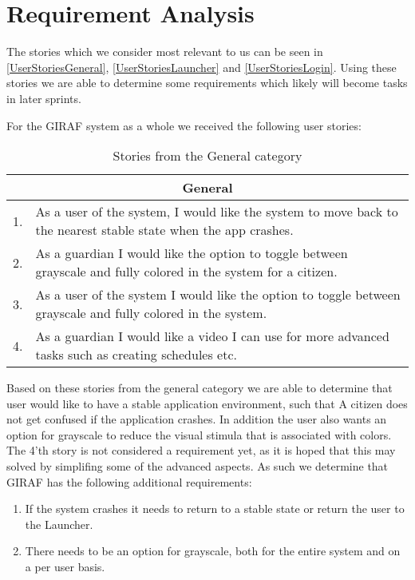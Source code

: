\section{Requirement Analysis}
The stories which we consider most relevant to us can be seen in
\autoref{UserStoriesGeneral}, \autoref{UserStoriesLauncher} and
\autoref{UserStoriesLogin}. Using these stories we are able to determine some
requirements which likely will become tasks in later sprints.\nl

For the GIRAF system as a whole we received the following user stories:
\begin{table}[H]
\begin{tabular}{|c|p{12.5cm}|}
\hline 
\multicolumn{2}{|c|}{General}\\\hline
1. & As a user of the system, I would like the system to move back to the
nearest stable state when the app crashes.\\\hline
2. & As a guardian I would like the option to toggle between grayscale and fully
colored in the system for a citizen. \\ \hline
3. & As a user of the system I would like the option to toggle between grayscale
and fully colored in the system. \\\hline
4. & As a guardian I would like a video I can use for more advanced tasks such
as creating schedules etc.\\\hline
\end{tabular}
\caption{Stories from the General category}
\label{UserStoriesGeneral}
\end{table}

Based on these stories from the general category we are able to determine that
user would like to have a stable application environment, such that A
citizen does not get confused if the application crashes. In addition the user
also wants an option for grayscale to reduce the visual stimula that is
associated with colors. The 4'th story is not considered a requirement yet, as
it is hoped that this may solved by simplifing some of the advanced aspects. As
such we determine that GIRAF has the following additional requirements:
\begin{enumerate}
  \item If the system crashes it needs to return to a stable state or return the
  user to the Launcher.
  \item There needs to be an option for grayscale, both for the entire system
  and on a per user basis.
\end{enumerate}

